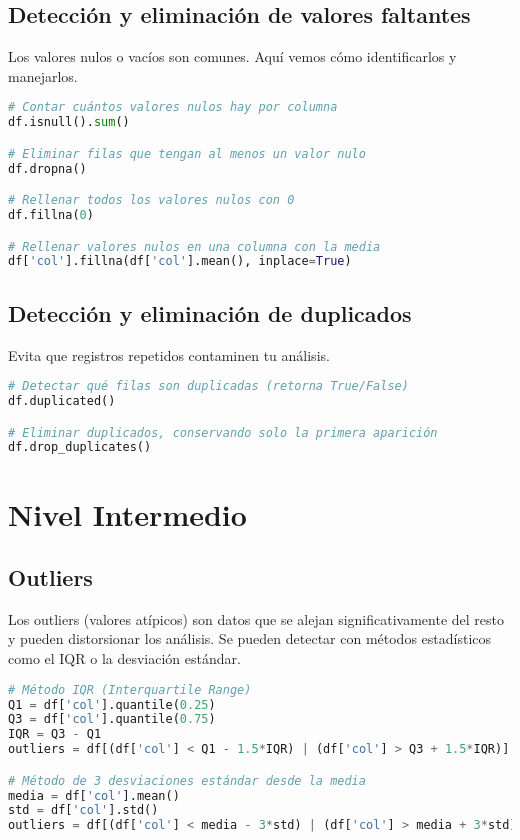 \documentclass[11pt]{article}
\begin{document}
\subsection*{Detección y eliminación de valores faltantes}
Los valores nulos o vacíos son comunes. Aquí vemos cómo identificarlos y manejarlos.

\begin{lstlisting}[language=Python]
# Contar cuántos valores nulos hay por columna
df.isnull().sum()

# Eliminar filas que tengan al menos un valor nulo
df.dropna()

# Rellenar todos los valores nulos con 0
df.fillna(0)

# Rellenar valores nulos en una columna con la media
df['col'].fillna(df['col'].mean(), inplace=True)
\end{lstlisting}

\subsection*{Detección y eliminación de duplicados}
Evita que registros repetidos contaminen tu análisis.

\begin{lstlisting}[language=Python]
# Detectar qué filas son duplicadas (retorna True/False)
df.duplicated()

# Eliminar duplicados, conservando solo la primera aparición
df.drop_duplicates()
\end{lstlisting}


\section*{Nivel Intermedio}

\subsection*{Outliers}
Los outliers (valores atípicos) son datos que se alejan significativamente del resto y pueden distorsionar los análisis. Se pueden detectar con métodos estadísticos como el IQR o la desviación estándar.

\begin{lstlisting}[language=Python]
# Método IQR (Interquartile Range)
Q1 = df['col'].quantile(0.25)
Q3 = df['col'].quantile(0.75)
IQR = Q3 - Q1
outliers = df[(df['col'] < Q1 - 1.5*IQR) | (df['col'] > Q3 + 1.5*IQR)]

# Método de 3 desviaciones estándar desde la media
media = df['col'].mean()
std = df['col'].std()
outliers = df[(df['col'] < media - 3*std) | (df['col'] > media + 3*std)]
\end{lstlisting}
\end{document}
